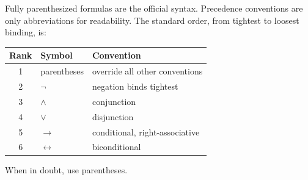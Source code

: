 \begin{remark*}
Fully parenthesized formulas are the official syntax. Precedence conventions
are only abbreviations for readability. The standard order, from tightest to
loosest binding, is:
\begin{center}
\renewcommand{\arraystretch}{1.2}
\begin{tabular}{c l l}
\toprule
\textbf{Rank} & \textbf{Symbol} & \textbf{Convention} \\
\midrule
1 & parentheses & override all other conventions \\
2 & $\neg$ & negation binds tightest \\
3 & $\land$ & conjunction \\
4 & $\lor$ & disjunction \\
5 & $\to$ & conditional, right-associative \\
6 & $\leftrightarrow$ & biconditional \\
\bottomrule
\end{tabular}
\end{center}
When in doubt, use parentheses.
\end{remark*}
